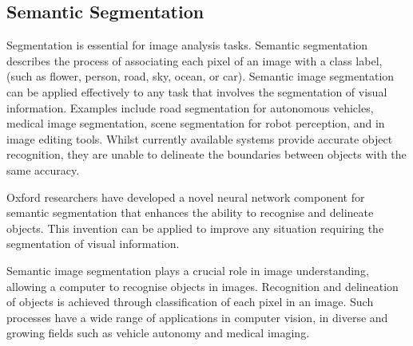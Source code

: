 



\subsection{Semantic Segmentation}\label{s:patt-sema}
Segmentation is essential for image analysis tasks. Semantic segmentation describes the process of associating each pixel of an image with a class label, (such as flower, person, road, sky, ocean, or car).
Semantic image segmentation can be applied effectively to any task that involves the segmentation of visual information. Examples include road segmentation for autonomous vehicles, medical image segmentation, scene segmentation for robot perception, and in image editing tools. Whilst currently available systems provide accurate object recognition, they are unable to delineate the boundaries between objects with the same accuracy.

Oxford researchers have developed a novel neural network component for semantic segmentation that enhances the ability to recognise and delineate objects. This invention can be applied to improve any situation requiring the segmentation of visual information.

Semantic image segmentation plays a crucial role in image understanding, allowing a computer to recognise objects in images. Recognition and delineation of objects is achieved through classification of each pixel in an image. Such processes have a wide range of applications in computer vision, in diverse and growing fields such as vehicle autonomy and medical imaging.

